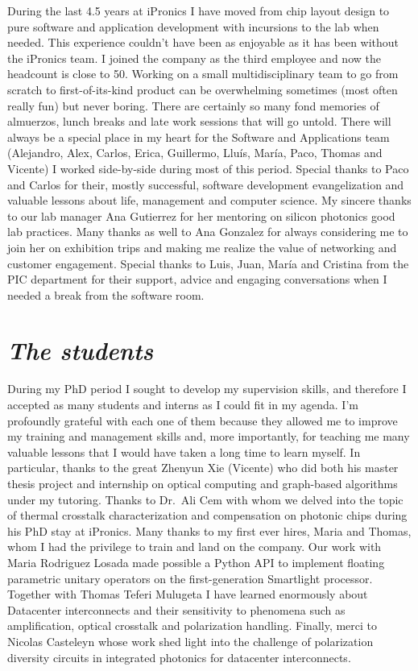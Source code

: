 During the last 4.5 years at iPronics I have moved from chip layout design to pure software and application development with incursions to the lab when needed.
This experience couldn't have been as enjoyable as it has been without the iPronics team.
I joined the company as the third employee and now the headcount is close to 50.
Working on a small multidisciplinary team to go from scratch to first-of-its-kind product can be overwhelming sometimes (most often really fun) but never boring.
There are certainly so many fond memories of almuerzos, lunch breaks and late work sessions that will go untold.
There will always be a special place in my heart for the Software and Applications team (Alejandro, Alex, Carlos, Erica, Guillermo, Lluís, María, Paco, Thomas and Vicente) I worked side-by-side during most of this period.
Special thanks to Paco and Carlos for their, mostly successful, software development evangelization and valuable lessons about life, management and computer science.
My sincere thanks to our lab manager Ana Gutierrez for her mentoring on silicon photonics good lab practices.
Many thanks as well to Ana Gonzalez for always considering me to join her on exhibition trips and making me realize the value of networking and customer engagement.
Special thanks to Luis, Juan, María and Cristina from the PIC department for their support, advice and engaging conversations when I needed a break from the software room.

\section*{\textit{The students}}

During my PhD period I sought to develop my supervision skills, and therefore I accepted as many students and interns as I could fit in my agenda.
I'm profoundly grateful with each one of them because they allowed me to improve my training and management skills and, more importantly, for teaching me many valuable lessons that I would have taken a long time to learn myself.
In particular, thanks to the great Zhenyun Xie (Vicente) who did both his master thesis project and internship on optical computing and graph-based algorithms under my tutoring.
Thanks to Dr.~Ali Cem with whom we delved into the topic of thermal crosstalk characterization and compensation on photonic chips during his PhD stay at iPronics.
Many thanks to my first ever hires, Maria and Thomas, whom I had the privilege to train and land on the company.
Our work with Maria Rodriguez Losada made possible a Python API to implement floating parametric unitary operators on the first-generation Smartlight processor.
Together with Thomas Teferi Mulugeta I have learned enormously about Datacenter interconnects and their sensitivity to phenomena such as amplification, optical crosstalk and polarization handling.
Finally, merci to Nicolas Casteleyn whose work shed light into the challenge of polarization diversity circuits in integrated photonics for datacenter interconnects.

